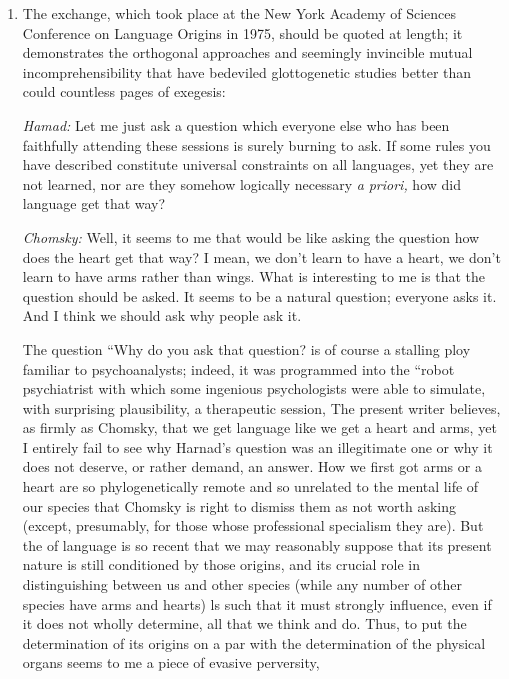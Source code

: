 \begin{enumerate}
\item The exchange, which took place at the New York Academy of Sciences Conference on Language Origins in 1975, should be quoted at length; it demonstrates the orthogonal approaches and seemingly 
invincible mutual incomprehensibility that have bedeviled glottogenetic
studies better than could countless pages of exegesis:

\textit{Hamad:} Let me just ask a question which everyone else who has been faithfully attending these sessions is surely burning to ask. If some rules you have described constitute universal constraints on all languages, yet they are not learned, nor are they somehow logically necessary \textit{a} \textit{priori,} how did language get that way?

\textit{Chomsky:} Well, it seems to me that would be like asking the question how does the heart get that way? I mean, we don't learn to have a heart, we don't learn to have arms rather than wings. What is interesting to me is that the question should be asked. It seems to be a natural question; everyone asks it. And I think we should ask why people ask it.

The question ``Why do you ask that question? is of course a stalling ploy familiar to psychoanalysts; indeed, it was programmed into the ``robot psychiatrist with which some ingenious psychologists were able to simulate, with surprising plausibility, a therapeutic session, The present writer believes, as firmly as Chomsky, that we get language like
we get a heart and arms, yet I entirely fail to see why Harnad's question
was an illegitimate one or why it does not deserve, or rather demand, an answer. How we first got arms or a heart are  so phylo\-genetically remote and so unrelated to the mental life of our species that Chomsky is right to dismiss them as not worth asking (except, presumably, for those whose professional specialism they are). But the  of language is so recent that we may reasonably suppose that its present nature is still conditioned by those origins, and its crucial role in distinguishing between us and other species (while any number of other species have arms and hearts) ls such that it must strongly influence, even if it does not wholly determine, all that we think and do. Thus, to put the determination of its origins on a par
with the determination of the  physical organs seems to me a piece of evasive perversity,


\end{enumerate}
